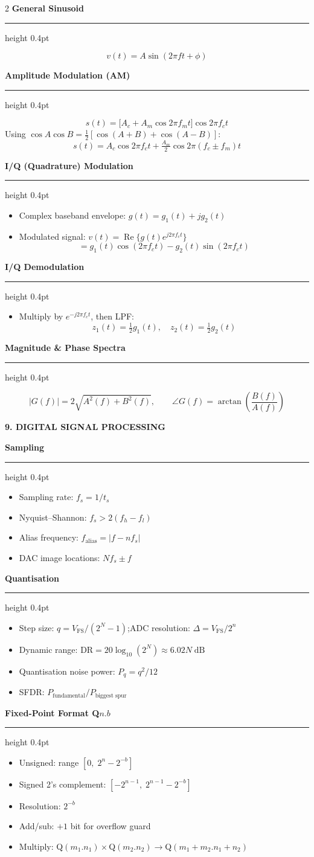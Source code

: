 \documentclass[10pt,a4paper]{article}
\newcommand{\sectionbox}[1]{%
  \vspace{3pt}%
  \noindent\colorbox{headerbg}{\parbox{\linewidth-2\fboxsep}%
    {\bfseries\small\color{white}\MakeUppercase{#1}}}%
  \vspace{1pt}%
}
\newcommand{\subsec}[1]{%
  \vspace{3pt}%
  {\small\bfseries\color{subseccolor}#1}%
  \vspace{1pt}\hrule height 0.4pt \vspace{2pt}%
}
\DeclareMathOperator{\Repart}{Re}
\begin{document}
\begin{multicols}{2}
\subsec{General Sinusoid}
\[v(t)=A\sin(2\pi ft+\phi)\]

\subsec{Amplitude Modulation (AM)}
\[
s(t)=\bigl[A_c+A_m\cos2\pi f_m t\bigr]\cos2\pi f_c t
\]
Using $\cos A\cos B=\tfrac{1}{2}[\cos(A+B)+\cos(A-B)]$:
\[
s(t)=A_c\cos2\pi f_c t+\tfrac{A_m}{2}\cos2\pi(f_c\pm f_m)t
\]

\subsec{I/Q (Quadrature) Modulation}
\begin{itemize}
  \item Complex baseband envelope: $g(t)=g_1(t)+jg_2(t)$
  \item Modulated signal: $v(t)=\Repart\{g(t)e^{j2\pi f_c t}\}$
  \[=g_1(t)\cos(2\pi f_c t)-g_2(t)\sin(2\pi f_c t)\]
\end{itemize}

\subsec{I/Q Demodulation}
\begin{itemize}
  \item Multiply by $e^{-j2\pi f_c t}$, then LPF:
  \[z_1(t)=\tfrac{1}{2}g_1(t),\quad z_2(t)=\tfrac{1}{2}g_2(t)\]
\end{itemize}

\subsec{Magnitude \& Phase Spectra}
\[
|G(f)|=2\sqrt{A^2(f)+B^2(f)},\qquad
\angle G(f)=\arctan\!\left(\frac{B(f)}{A(f)}\right)
\]

\sectionbox{9. Digital Signal Processing}

\subsec{Sampling}
\begin{itemize}
  \item Sampling rate: $f_s=1/t_s$
  \item Nyquist–Shannon: $f_s>2(f_h-f_l)$
  \item Alias frequency: $f_\text{alias}=|f-nf_s|$
  \item DAC image locations: $Nf_s\pm f$
\end{itemize}

\subsec{Quantisation}
\begin{itemize}
  \item Step size: $q=V_\text{FS}/(2^N-1)$;\quad ADC resolution: $\Delta=V_\text{FS}/2^n$
  \item Dynamic range: $\text{DR}=20\log_{10}(2^N)\approx6.02N\;\text{dB}$
  \item Quantisation noise power: $P_q=q^2/12$
  \item SFDR: $P_\text{fundamental}/P_\text{biggest spur}$
\end{itemize}

\subsec{Fixed-Point Format Q$n.b$}
\begin{itemize}
  \item Unsigned: range $[0,\;2^n-2^{-b}]$
  \item Signed 2's complement: $[-2^{n-1},\;2^{n-1}-2^{-b}]$
  \item Resolution: $2^{-b}$
  \item Add/sub: $+1$ bit for overflow guard
  \item Multiply: Q$(m_1.n_1)\!\times\!$Q$(m_2.n_2)\!\to\!$Q$(m_1{+}m_2{.}n_1{+}n_2)$
\end{itemize}


\end{multicols}
\end{document}
